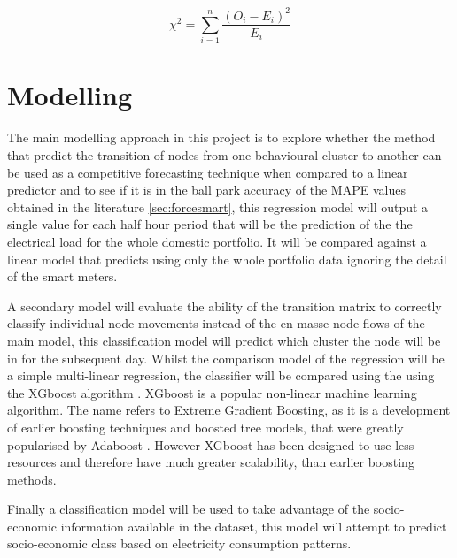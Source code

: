\begin{equation}
    \chi ^2 = \sum_{i=1}^n \frac{(O_i-E_i)^2}{E_i}
\end{equation}

\section{Modelling}
The main modelling approach in this project is to explore whether the method that predict the transition of nodes from one behavioural cluster to another can be used as a competitive forecasting technique when compared to a linear predictor and to see if it is in the ball park accuracy of the MAPE values obtained in the literature \ref{sec:forcesmart}, this regression model will output a single value for each half hour period that will be the prediction of the the electrical load for the whole domestic portfolio. It will be compared against a linear model that predicts using only the whole portfolio data ignoring the detail of the smart meters.

A secondary model will evaluate the ability of the transition matrix to correctly classify individual node movements instead of the en masse node flows of the main model, this classification model will predict which cluster the node will be in for the subsequent day. Whilst the comparison model of the regression will be a simple multi-linear regression, the classifier will be compared using the using the XGboost algorithm \cite{chen2016}. XGboost is a popular non-linear machine learning algorithm. The name refers to Extreme Gradient Boosting, as it is a development of earlier boosting techniques \cite{schapire2003} and boosted tree models, that were greatly popularised by Adaboost  \cite{freund1997}. However XGboost has been designed to use less resources and therefore have much greater scalability, than earlier boosting methods.

Finally a classification model will be used to take advantage of the socio-economic information available in the dataset, this model will attempt to predict socio-economic class based on electricity consumption patterns.


